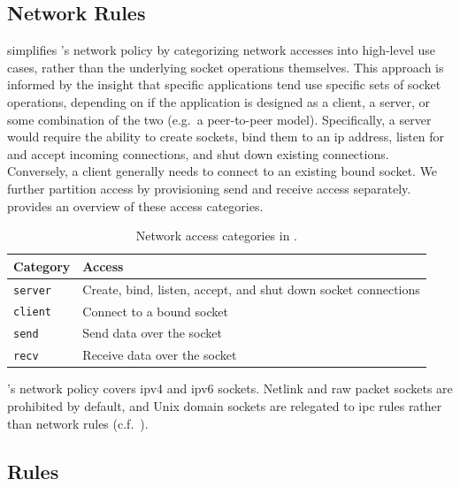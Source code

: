 \subsection{Network Rules}

\bpfcontain{} simplifies \bpfbox{}'s network policy by categorizing network accesses into
high-level use cases, rather than the underlying socket operations themselves. This
approach is informed by the insight that specific applications tend use specific sets of
socket operations, depending on if the application is designed as a client, a server, or
some combination of the two (e.g.~a peer-to-peer model). Specifically, a server would
require the ability to create sockets, bind them to an \gls{ip} address, listen for and
accept incoming connections, and shut down existing connections. Conversely, a client
generally needs to connect to an existing bound socket. We further partition access by
provisioning send and receive access separately.  provides an
overview of these access categories.

\begin{table}[htpb]
  \centering
  \caption[Network access categories in \bpfcontain{}]{
    Network access categories in \bpfcontain{}.
  }%
  \label{tab:bpfcontain-network}
  \begin{tabular}{ll}
  \toprule
  Category & Access \\
  \midrule
  \texttt{server} & Create, bind, listen, accept, and shut down socket connections \\
  \texttt{client} & Connect to a bound socket \\
  \texttt{send} & Send data over the socket \\
  \texttt{recv} & Receive data over the socket \\
  \bottomrule
  \end{tabular}
\end{table}

\bpfcontain{}'s network policy covers \gls{ip}v4 and \gls{ip}v6 sockets. Netlink and raw
packet sockets are prohibited by default, and Unix domain sockets are relegated to
\gls{ipc} rules rather than network rules (c.f.~).

\subsection{ Rules}%
\label{ss:bpfcontain-ipc}

